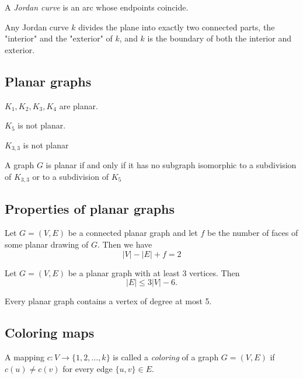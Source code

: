 \documentclass{classnotes}
\begin{document}
\begin{definition}
    A \emph{Jordan curve} is an arc whose endpoints coincide.
\end{definition}

\begin{theorem}
    Any Jordan curve $k$ divides the plane into exactly two connected parts, the "interior" and the "exterior" of $k$, and $k$ is the boundary of both the interior and exterior.
\end{theorem}

\subsection{Planar graphs}
\begin{proposition}
    $K_1,K_2,K_3,K_4$ are planar.

    $K_5$ is not planar.
\end{proposition}
\begin{proposition}
    $K_{3,3}$ is not planar
\end{proposition}

\begin{theorem}
    A graph $G$ is planar if and only if it has no subgraph isomorphic to a subdivision of $K_{3,3}$ or to a subdivision of $K_5$
\end{theorem}

\subsection{Properties of planar graphs}
\begin{theorem}
    Let $G=(V,E)$ be a connected planar graph and let $f$ be the number of faces of some planar drawing of $G$. Then we have 
    $$|V|-|E|+f=2$$
\end{theorem}

\begin{theorem}
    Let $G=(V,E)$ be a planar graph with at least 3 vertices. Then
    $$|E| \le 3|V| - 6.$$
\end{theorem}

\begin{corollary}
    Every planar graph contains a vertex of degree at most 5.
\end{corollary}

\subsection{Coloring maps}
\begin{definition}
    A mapping $c: V \to \{1,2,\dots,k\}$ is called a \emph{coloring} of a graph $G=(V,E)$ if $c(u) \ne c(v)$ for every edge $\{u,v\} \in E$.
\end{definition}
\end{document}
